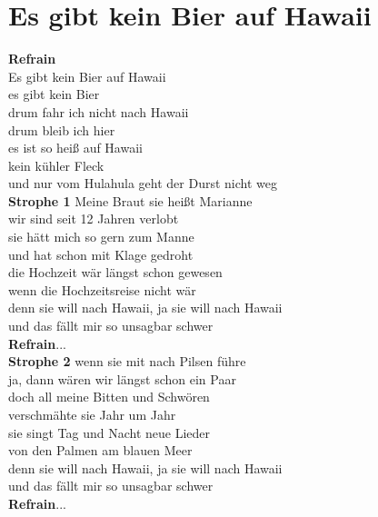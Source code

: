 \documentclass[twoside,8pt]{scrartcl}
\begin{document}
\section{Es gibt kein Bier auf Hawaii}
\textbf{Refrain}\\
Es gibt kein Bier auf Hawaii\\
es gibt kein Bier\\
drum fahr ich nicht nach Hawaii\\
drum bleib ich hier\\
es ist so heiß auf Hawaii\\
kein kühler Fleck\\
und nur vom Hulahula geht der Durst nicht weg\\
\newline
\textbf{Strophe 1}\newline
Meine Braut sie heißt Marianne\\
wir sind seit 12 Jahren verlobt\\
sie hätt mich so gern zum Manne\\
und hat schon mit Klage gedroht\\
die Hochzeit wär längst schon gewesen\\
wenn die Hochzeitsreise nicht wär\\
denn sie will nach Hawaii, ja sie will nach Hawaii\\
und das fällt mir so unsagbar schwer\\
\newline
\textbf{Refrain}...\\
\newline
\textbf{Strophe 2}\newline
wenn sie mit nach Pilsen führe\\
ja, dann wären wir längst schon ein Paar\\
doch all meine Bitten und Schwören\\
verschmähte sie Jahr um Jahr\\
sie singt Tag und Nacht neue Lieder\\
von den Palmen am blauen Meer\\
denn sie will nach Hawaii, ja sie will nach Hawaii\\
und das fällt mir so unsagbar schwer\\
\newline
\textbf{Refrain}...
\clearpage
\end{document}
